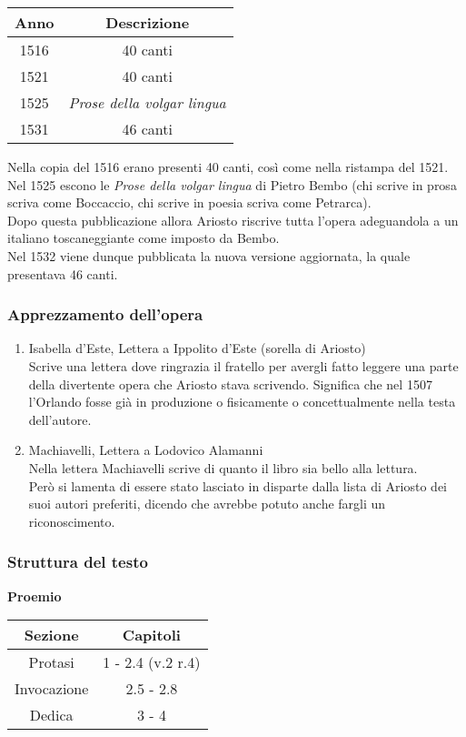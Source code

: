 \documentclass{article}
\begin{document}
\begin{tabular}{|c|c|}
\hline
Anno & Descrizione \\
\hline
1516 & 40 canti \\
1521 & 40 canti \\
1525 & \textit{Prose della volgar lingua} \\
1531 & 46 canti \\
\hline
\end{tabular}

Nella copia del 1516 erano presenti 40 canti, così come nella ristampa del 1521.\\
Nel 1525 escono le \textit{Prose della volgar lingua} di Pietro Bembo (chi scrive in prosa scriva come Boccaccio, chi scrive in poesia scriva come Petrarca).\\
Dopo questa pubblicazione allora Ariosto riscrive tutta l'opera adeguandola a un italiano toscaneggiante come imposto da Bembo.\\
Nel 1532 viene dunque pubblicata la nuova versione aggiornata, la quale presentava 46 canti.

\subsubsection{Apprezzamento dell'opera}
\begin{enumerate}
    \item Isabella d'Este, Lettera a Ippolito d'Este (sorella di Ariosto)\\
    Scrive una lettera dove ringrazia il fratello per avergli fatto leggere una parte della divertente opera che Ariosto stava scrivendo. Significa che nel 1507 l'Orlando fosse già in produzione o fisicamente o concettualmente nella testa dell'autore.
    \item Machiavelli, Lettera a Lodovico Alamanni\\
    Nella lettera Machiavelli scrive di quanto il libro sia bello alla lettura.\\
    Però si lamenta di essere stato lasciato in disparte dalla lista di Ariosto dei suoi autori preferiti, dicendo che avrebbe potuto anche fargli un riconoscimento.
\end{enumerate}

\subsubsection{Struttura del testo}
\textbf{Proemio} \phantom{}

\begin{tabular}{|c|c|}
\hline
Sezione & Capitoli \\
\hline
Protasi & 1 - 2.4 (v.2 r.4) \\
Invocazione & 2.5 - 2.8 \\
Dedica & 3 - 4 \\
\hline
\end{tabular}
\end{document}
